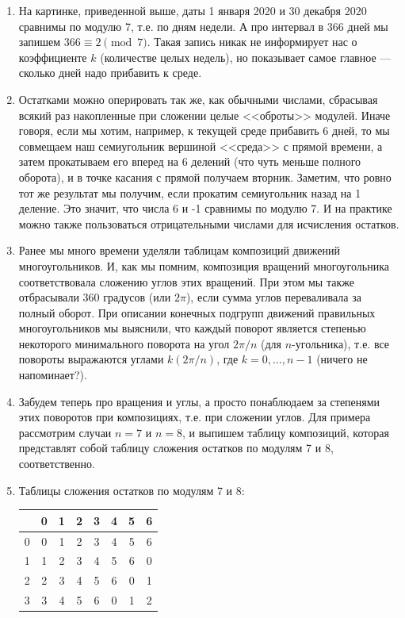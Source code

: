 \begin{enumerate}
\item На картинке, приведенной выше, даты 1 января 2020 и 30 декабря 2020 сравнимы по модулю 7, т.е. по дням недели.
А про интервал в 366 дней мы запишем $366\equiv 2\pmod 7$. Такая запись никак не информирует нас о коэффициенте $k$ (количестве целых недель), но показывает самое главное --- сколько дней надо прибавить к среде.
\item Остатками можно оперировать так же, как обычными числами, сбрасывая всякий раз накопленные при сложении целые <<оброты>> модулей. Иначе говоря, если мы хотим, например, к текущей среде прибавить 6 дней, то мы совмещаем наш семиугольник вершиной <<среда>> с прямой времени, а затем прокатываем его вперед на 6 делений (что чуть меньше полного оборота), и в точке касания с прямой получаем вторник. Заметим, что ровно тот же результат мы получим, если прокатим семиугольник назад на 1 деление. Это значит, что числа 6 и -1 сравнимы по модулю 7. И на практике можно также пользоваться отрицательными числами для исчисления остатков.
\item Ранее мы много времени уделяли таблицам композиций движений многоугольников. И, как мы помним, композиция вращений многоугольника соответствовала сложению углов этих вращений. При этом мы также отбрасывали 360 градусов (или $2\pi$), если сумма углов переваливала за полный оборот. При описании конечных подгрупп движений правильных многоугольников мы выяснили, что каждый поворот является степенью некоторого минимального поворота на угол $2\pi/n$ (для $n$-угольника), т.е. все повороты выражаются углами $k(2\pi/n)$, где $k=0,\dots,n-1$ (ничего не напоминает?).
\item Забудем теперь про вращения и углы, а просто понаблюдаем за степенями этих поворотов при композициях, т.е. при сложении углов. Для примера рассмотрим случаи $n=7$ и $n=8$, и выпишем таблицу композиций, которая представлят собой таблицу сложения остатков по модулям 7 и 8, соответственно.
\item Таблицы сложения остатков по модулям 7 и 8:
\begin{center}
\begin{tabular}{c||c|c|c|c|c|c|c|}
  & 0 & 1 & 2 & 3 & 4 & 5 & 6 \\ \hline\hline
0 & 0 & 1 & 2 & 3 & 4 & 5 & 6 \\ \hline
1 & 1 & 2 & 3 & 4 & 5 & 6 & 0 \\ \hline
2 & 2 & 3 & 4 & 5 & 6 & 0 & 1 \\ \hline
3 & 3 & 4 & 5 & 6 & 0 & 1 & 2 \\ \hline

\end{tabular}
\end{center}
\end{enumerate}
